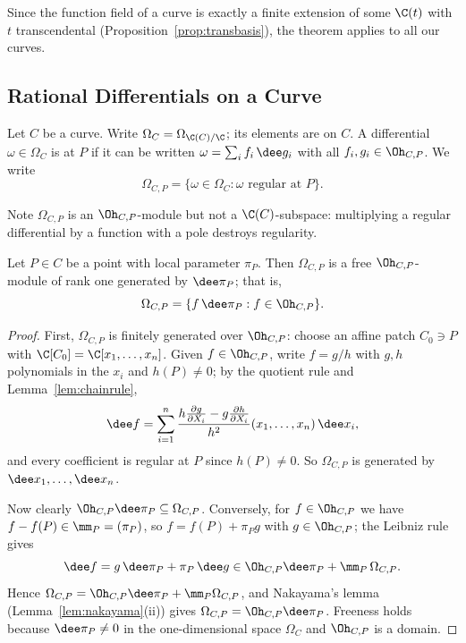 Since the function field of a curve is exactly a finite extension of some $\C(t)$ with $t$ transcendental (Proposition~\ref{prop:transbasis}), the theorem applies to all our curves.

\subsection{Rational Differentials on a Curve}

\begin{definition}
	Let $C$ be a curve. Write $\Omega_C = \Omega_{\C(C)/\C}$; its elements are  on $C$. A differential $\omega \in \Omega_C$ is  at $P$ if it can be written $\omega = \sum_i f_i\,\dee g_i$ with all $f_i,g_i \in \Oh_{C,P}$. We write
	$$\Omega_{C,P} = \{\omega \in \Omega_C : \omega \text{ regular at } P\}.$$
\end{definition}

Note $\Omega_{C,P}$ is an $\Oh_{C,P}$-module but not a $\C(C)$-subspace: multiplying a regular differential by a function with a pole destroys regularity.

\begin{theorem}\label{thm:omegafree}
	Let $P \in C$ be a point with local parameter $\pi_P$. Then $\Omega_{C,P}$ is a free $\Oh_{C,P}$-module of rank one generated by $\dee\pi_P$; that is,
	$$\Omega_{C,P} = \{f\,\dee\pi_P : f \in \Oh_{C,P}\}.$$
\end{theorem}

\begin{proof}
	First, $\Omega_{C,P}$ is finitely generated over $\Oh_{C,P}$: choose an affine patch $C_0 \ni P$ with $\C[C_0] = \C[x_1,\dots,x_n]$. Given $f \in \Oh_{C,P}$, write $f = g/h$ with $g,h$ polynomials in the $x_i$ and $h(P)\neq0$; by the quotient rule and Lemma~\ref{lem:chainrule},
	$$\dee f = \sum_{i=1}^n \frac{h\frac{\partial g}{\partial X_i} - g\frac{\partial h}{\partial X_i}}{h^2}(x_1,\dots,x_n)\,\dee x_i,$$
	and every coefficient is regular at $P$ since $h(P)\neq0$. So $\Omega_{C,P}$ is generated by $\dee x_1,\dots,\dee x_n$.

	Now clearly $\Oh_{C,P}\dee\pi_P \subseteq \Omega_{C,P}$. Conversely, for $f \in \Oh_{C,P}$ we have $f - f(P) \in \mm_P = (\pi_P)$, so $f = f(P) + \pi_P g$ with $g \in \Oh_{C,P}$; the Leibniz rule gives
	$$\dee f = g\,\dee\pi_P + \pi_P\,\dee g \in \Oh_{C,P}\dee\pi_P + \mm_P\,\Omega_{C,P}.$$
	Hence $\Omega_{C,P} = \Oh_{C,P}\dee\pi_P + \mm_P\Omega_{C,P}$, and Nakayama's lemma (Lemma~\ref{lem:nakayama}(ii)) gives $\Omega_{C,P} = \Oh_{C,P}\dee\pi_P$. Freeness holds because $\dee\pi_P \neq 0$ in the one-dimensional space $\Omega_C$ and $\Oh_{C,P}$ is a domain.
\end{proof}

